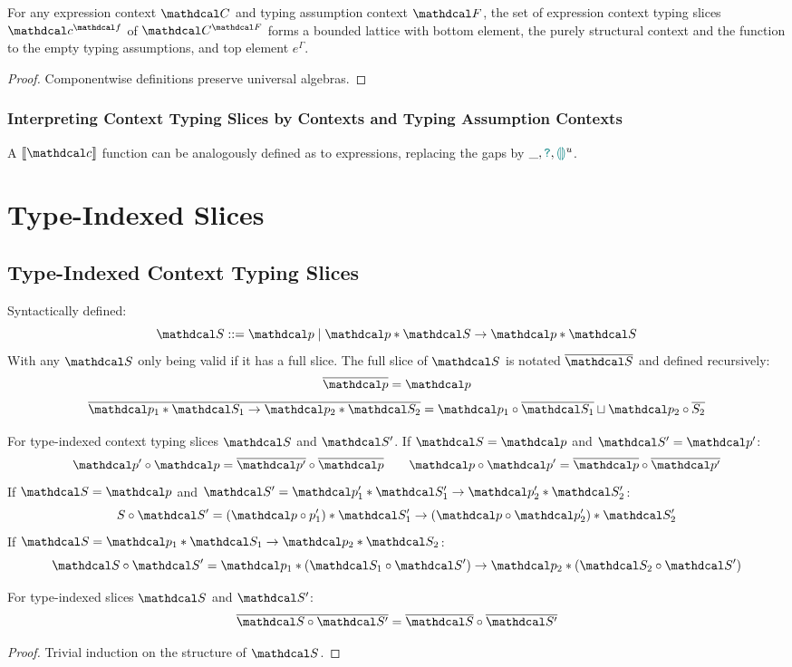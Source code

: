 \begin{proposition}
For any expression context $\C$ and typing assumption context $\F$, the set of expression context typing slices $\Cs^{\f}$ of $\C^{\F}$ forms a bounded lattice with bottom element, the purely structural context and the function to the empty typing assumptions, and top element $e^{\Gamma}$.
\end{proposition}
\begin{proof}
Componentwise definitions preserve universal algebras.
\end{proof}
\subsubsection{Interpreting Context Typing Slices by Contexts and Typing Assumption Contexts}
A $\type{\Cs}$ function can be analogously defined as to expressions, replacing the gaps by $\_, {\color{teal}\texttt{?}},{\color{teal}\llparenthesis}  {\color{teal}\rrparenthesis}^u$.

\section{Type-Indexed Slices}
\subsection{Type-Indexed Context Typing Slices}
\begin{definition}
Syntactically defined: 
\[\S ::= \p \mid \p * \S \to \p * \S\] 
With any $\S$ only being valid if it has a full slice. The full slice of $\S$ is notated $\overline{\S}$ and defined recursively:
\[\overline{\p} = \p\]
\[\overline{\p_1 * \S_1 \to \p_2 * \S_2} = \p_1 \circ \overline{\S_1} \sqcup \p_2 \circ \overline{S_2}\]
\end{definition}
\begin{definition}
For type-indexed context typing slices $\S$ and $\S'$.  If $\S = \p$ and $\S' = \p'$:
\[\p' \circ \p = \overline{\p'} \circ \overline{\p}\qquad \p \circ \p' = \overline{\p} \circ \overline{\p'}\]
If $\S = \p$ and $\S' = \p_1' * \S_1' \to \p_2' * \S_2'$:
\[S \circ \S' = (\p \circ p_1') * \S_1' \to (\p \circ \p_2') * \S_2'\]
If $\S = \p_1 * \S_1 \to \p_2 * \S_2$:
\[\S \circ \S' = \p_1 * (\S_1 \circ \S') \to \p_2 * (\S_2 \circ \S')\]
\end{definition}

\begin{proposition}
For type-indexed slices $\S$ and $\S'$: 
\[\overline{\S \circ \S'} = \overline{\S} \circ \overline{\S'}\]
\end{proposition}
\begin{proof}
Trivial induction on the structure of $\S$.
\end{proof}
